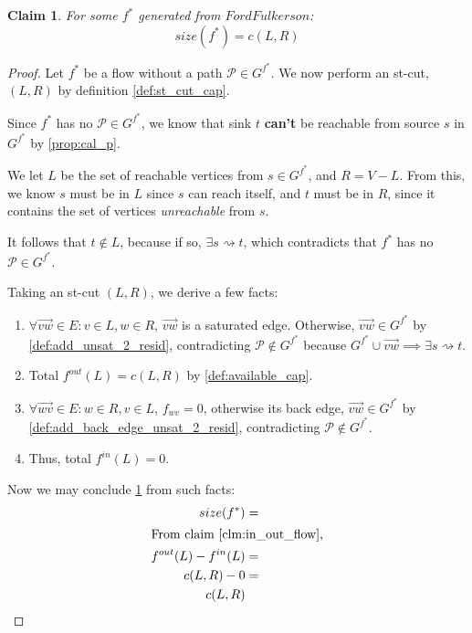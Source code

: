 \documentclass{article}
\newtheorem{claim}[theorem]{Claim}
\theoremstyle{definition}
\begin{document}
\begin{claim}
\label{clm:size_f_star_is_clr}
	For some $f^*$ generated from $FordFulkerson$:
	$$size(f^*) = c(L,R)$$	
\end{claim}

\begin{proof}
Let $f^*$ be a flow without a path $\mathcal{P} \in G^{f^*}$. We now perform an st-cut, $(L, R)$ by definition \ref{def:st_cut_cap}.

Since $f^*$ has no $\mathcal{P} \in G^{f^*}$, we know that sink $t$ \textbf{can't} be reachable from source $s$ in $G^{f^*}$ by \ref{prop:cal_p}. 

We let $L$ be the set of reachable vertices from $s \in G^{f^*}$, and $R = V - L$. From this, we know $s$ must be in $L$ since $s$ can reach itself, and $t$ must be in $R$, since it contains the set of vertices \textit{unreachable} from $s$. 

It follows that $t \notin L$, because if so, $\exists s \rightsquigarrow t$, which contradicts that $f^*$ has no $\mathcal{P} \in G^{f^*}$.

Taking an st-cut $(L,R)$, we derive a few facts:

\begin{enumerate}
	\item $\forall \overrightarrow{vw} \in E : v \in L, w \in R$, $\overrightarrow{vw}$ is a saturated edge. Otherwise, $\overrightarrow{vw} \in G^{f^*}$ by \ref{def:add_unsat_2_resid}, contradicting $\mathcal{P} \notin G^{f^*}$ because $G^{f^*} \cup \overrightarrow{vw} \implies \exists s \rightsquigarrow t$.
	\item Total $f^{out}(L) = c(L,R)$ by \ref{def:available_cap}.
	\item  $\forall \overrightarrow{wv} \in E : w \in R, v \in L$, $f_{wv} = 0$, otherwise its back edge, $\overrightarrow{vw} \in G^{f^*}$ by \ref{def:add_back_edge_unsat_2_resid}, contradicting $\mathcal{P} \notin G^{f^*}$.
	\item Thus, total $f^{in}(L) = 0$.
\end{enumerate}

Now we may conclude \ref{clm:size_f_star_is_clr} from such facts:
\begin{align*}
size(f^*) &=\\
\shortintertext{From claim \ref{clm:in_out_flow},}
f^{out}(L) - f^{in}(L)&=\\
c(L,R)- 0&=\\
c(L,R)
\end{align*}
\end{proof}
\end{document}
